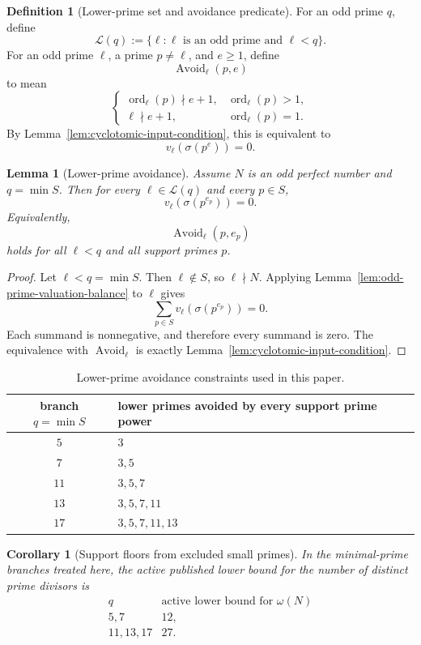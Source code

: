 \documentclass[11pt]{article}
\newtheorem{lemma}[theorem]{Lemma}
\newtheorem{corollary}[theorem]{Corollary}
\theoremstyle{definition}
\newtheorem{definition}[theorem]{Definition}
\theoremstyle{remark}
\DeclareMathOperator{\ord}{ord}
\newcommand{\Lset}{\mathcal L}
\begin{document}
\begin{definition}[Lower-prime set and avoidance predicate]
For an odd prime \(q\), define
\[
  \Lset(q):=\{\ell:\ell\text{ is an odd prime and }\ell<q\}.
\]
For an odd prime \(\ell\), a prime \(p\ne\ell\), and \(e\ge1\), define
\[
  \operatorname{Avoid}_{\ell}(p,e)
\]
to mean
\[
  \begin{cases}
  \ord_\ell(p)\nmid e+1, & \ord_\ell(p)>1,\\[3pt]
  \ell\nmid e+1, & \ord_\ell(p)=1.
  \end{cases}
\]
By Lemma~\ref{lem:cyclotomic-input-condition}, this is equivalent to
\[
  v_\ell(\sigma(p^e))=0.
\]
\end{definition}

\begin{lemma}[Lower-prime avoidance]
\label{lem:lower-prime-avoidance}
Assume \(N\) is an odd perfect number and \(q=\min S\).  Then for every
\(\ell\in\Lset(q)\) and every \(p\in S\),
\[
  v_\ell(\sigma(p^{e_p}))=0.
\]
Equivalently,
\[
  \operatorname{Avoid}_{\ell}(p,e_p)
\]
holds for all \(\ell<q\) and all support primes \(p\).
\end{lemma}

\begin{proof}
Let \(\ell<q=\min S\).  Then \(\ell\notin S\), so \(\ell\nmid N\).  Applying
Lemma~\ref{lem:odd-prime-valuation-balance} to \(\ell\) gives
\[
  \sum_{p\in S}v_\ell(\sigma(p^{e_p}))=0.
\]
Each summand is nonnegative, and therefore every summand is zero.  The
equivalence with \(\operatorname{Avoid}_{\ell}\) is exactly
Lemma~\ref{lem:cyclotomic-input-condition}.
\end{proof}

\begin{table}[ht]
\centering
\begin{tabular}{c|l}
\toprule
branch \(q=\min S\) & lower primes avoided by every support prime power \\
\midrule
\(5\) & \(3\)\\
\(7\) & \(3,5\)\\
\(11\) & \(3,5,7\)\\
\(13\) & \(3,5,7,11\)\\
\(17\) & \(3,5,7,11,13\)\\
\bottomrule
\end{tabular}
\caption{Lower-prime avoidance constraints used in this paper.}
\label{tab:lower-prime-avoidance}
\end{table}

\begin{corollary}[Support floors from excluded small primes]
\label{cor:support-floors}
In the minimal-prime branches treated here, the active published lower bound
for the number of distinct prime divisors is
\[
\begin{array}{c|c}
q & \text{active lower bound for }\omega(N)\\
\hline
5,7 & 12,\\
11,13,17 & 27.
\end{array}
\]
\end{corollary}
\end{document}
